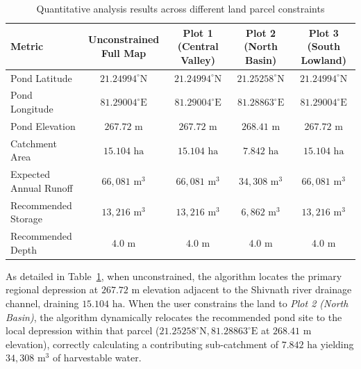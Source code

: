 \documentclass[manuscript,screen]{acmart}
\begin{document}
\begin{table}[h]
  \caption{Quantitative analysis results across different land parcel constraints}
  \label{tab:results}
  \begin{tabular}{lcccc}
    \toprule
    Metric & Unconstrained Full Map & Plot 1 (Central Valley) & Plot 2 (North Basin) & Plot 3 (South Lowland) \\
    \midrule
    Pond Latitude & $21.24994^\circ\text{N}$ & $21.24994^\circ\text{N}$ & $21.25258^\circ\text{N}$ & $21.24994^\circ\text{N}$ \\
    Pond Longitude & $81.29004^\circ\text{E}$ & $81.29004^\circ\text{E}$ & $81.28863^\circ\text{E}$ & $81.29004^\circ\text{E}$ \\
    Pond Elevation & $267.72\text{ m}$ & $267.72\text{ m}$ & $268.41\text{ m}$ & $267.72\text{ m}$ \\
    Catchment Area & $15.104\text{ ha}$ & $15.104\text{ ha}$ & $7.842\text{ ha}$ & $15.104\text{ ha}$ \\
    Expected Annual Runoff & $66{,}081\text{ m}^3$ & $66{,}081\text{ m}^3$ & $34{,}308\text{ m}^3$ & $66{,}081\text{ m}^3$ \\
    Recommended Storage & $13{,}216\text{ m}^3$ & $13{,}216\text{ m}^3$ & $6{,}862\text{ m}^3$ & $13{,}216\text{ m}^3$ \\
    Recommended Depth & $4.0\text{ m}$ & $4.0\text{ m}$ & $4.0\text{ m}$ & $4.0\text{ m}$ \\
    \bottomrule
  \end{tabular}
\end{table}

As detailed in Table~\ref{tab:results}, when unconstrained, the algorithm locates the primary regional depression at $267.72\text{ m}$ elevation adjacent to the Shivnath river drainage channel, draining $15.104\text{ ha}$. When the user constrains the land to \emph{Plot 2 (North Basin)}, the algorithm dynamically relocates the recommended pond site to the local depression within that parcel ($21.25258^\circ\text{N}, 81.28863^\circ\text{E}$ at $268.41\text{ m}$ elevation), correctly calculating a contributing sub-catchment of $7.842\text{ ha}$ yielding $34,308\text{ m}^3$ of harvestable water.
\end{document}
